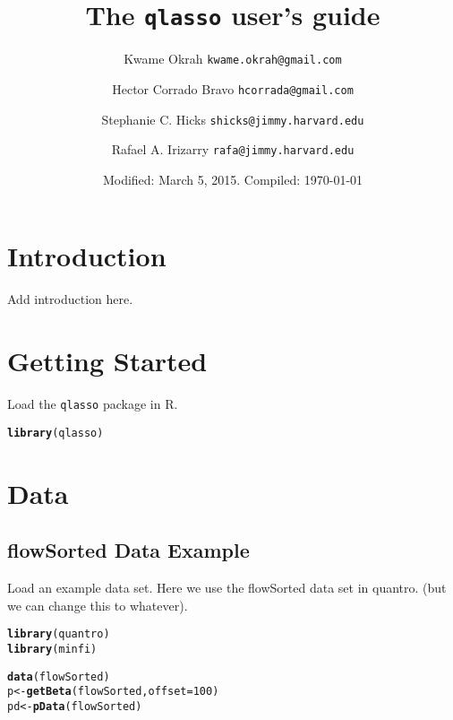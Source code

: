 \documentclass{article}\usepackage[]{graphicx}\usepackage[usenames,dvipsnames]{color}
\title{The \texttt{qlasso} user's guide}
\author{Kwame Okrah \texttt{kwame.okrah@gmail.com} \and
Hector Corrado Bravo \texttt{hcorrada@gmail.com} \and
Stephanie C. Hicks \texttt{shicks@jimmy.harvard.edu} \and
Rafael A. Irizarry \texttt{rafa@jimmy.harvard.edu} }
\date{Modified: March 5, 2015.  Compiled: \today}
\makeatletter
\newcommand{\hlnum}[1]{\textcolor[rgb]{0.686,0.059,0.569}{#1}}%
\newcommand{\hlstd}[1]{\textcolor[rgb]{0.345,0.345,0.345}{#1}}%
\newcommand{\hlkwb}[1]{\textcolor[rgb]{0.69,0.353,0.396}{#1}}%
\newcommand{\hlkwc}[1]{\textcolor[rgb]{0.333,0.667,0.333}{#1}}%
\newcommand{\hlkwd}[1]{\textcolor[rgb]{0.737,0.353,0.396}{\textbf{#1}}}%
\newenvironment{kframe}{%
 \def\at@end@of@kframe{}%
 \ifinner\ifhmode%
  \def\at@end@of@kframe{\end{minipage}}%
  \begin{minipage}{\columnwidth}%
 \fi\fi%
 \def\FrameCommand##1{\hskip\@totalleftmargin \hskip-\fboxsep
 \colorbox{shadecolor}{##1}\hskip-\fboxsep
     \hskip-\linewidth \hskip-\@totalleftmargin \hskip\columnwidth}%
 \MakeFramed {\advance\hsize-\width
   \@totalleftmargin\z@ \linewidth\hsize
   \@setminipage}}%
 {\par\unskip\endMakeFramed%
 \at@end@of@kframe}
\newenvironment{knitrout}{}{} %
\makeatother
\begin{document}
\maketitle
 
\tableofcontents

\section{Introduction}

Add introduction here. 

\section{Getting Started}

Load the \texttt{qlasso} package in R. 

\begin{knitrout}
\color{fgcolor}\begin{kframe}
\begin{alltt}
\hlkwd{library}\hlstd{(qlasso)}
\end{alltt}
\end{kframe}
\end{knitrout}


\section{Data}

\subsection{flowSorted Data Example}
Load an example data set. Here we use the flowSorted data set in quantro. 
(but we can change this to whatever). 

\begin{knitrout}
\color{fgcolor}\begin{kframe}
\begin{alltt}
\hlkwd{library}\hlstd{(quantro)}
\hlkwd{library}\hlstd{(minfi)}
\end{alltt}
\end{kframe}
\end{knitrout}


\begin{knitrout}
\color{fgcolor}\begin{kframe}
\begin{alltt}
\hlkwd{data}\hlstd{(flowSorted)}
\hlstd{p} \hlkwb{<-} \hlkwd{getBeta}\hlstd{(flowSorted,} \hlkwc{offset} \hlstd{=} \hlnum{100}\hlstd{)}
\hlstd{pd} \hlkwb{<-} \hlkwd{pData}\hlstd{(flowSorted)}
\end{alltt}
\end{kframe}
\end{knitrout}
\end{document}
